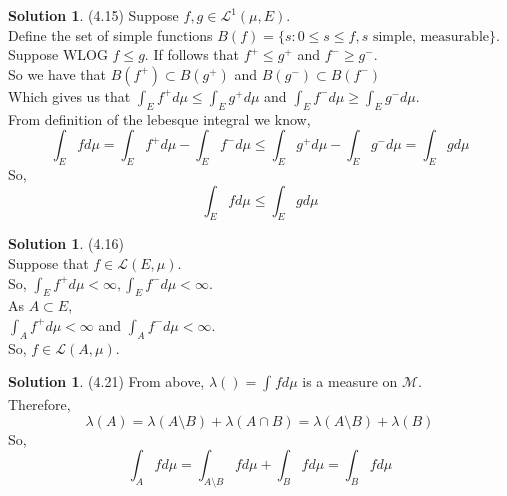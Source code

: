 \documentclass[letterpaper,12pt]{article}
\theoremstyle{definition}
\newtheorem{solution}[theorem]{Solution}
\begin{document}
\begin{solution}{(4.15)}
Suppose $f,g \in \mathcal{L}^1(\mu,E)$. \\
Define the set of simple functions $B(f) = \{ s : 0 \leq s \leq f, s \text{ simple, measurable}  \}$. \\
Suppose WLOG $f \leq g$. If follows that $f^+ \leq g^+$ and $f^- \geq g^-$. \\
So we have that $B(f^+) \subset B(g^+)$ and $B(g^-) \subset B(f^-)$ \\
Which gives us that $ \int_E f^+ d\mu \leq \int_E g^+ d\mu$ and $\int_E f^- d\mu \geq \int_E g^- d\mu$. \\
From definition of the lebesque integral we know,
\begin{equation*}
	\int_E fd\mu = \int_E f^+ d\mu - \int_E f^- d\mu \leq \int_E g^+ d\mu - \int_E g^- d\mu = \int_E g d\mu
\end{equation*}
So,
\begin{equation*}
	\int_E fd\mu \leq \int_E g d\mu
\end{equation*}
\end{solution}

\begin{solution}{(4.16)} \\
Suppose that $f \in \mathcal{L}(E, \mu)$. \\
So, $ \int_E f^+ d\mu < \infty, \int_E f^- d\mu < \infty$. \\
As $A \subset E$, \\
$\int_A f^+ d\mu < \infty$ and $\int_A f^- d\mu < \infty$. \\
So, $f \in \mathcal{L}(A, \mu)$.
\end{solution}

\begin{solution}{(4.21)}
From above, $ \lambda() = \int_{} f d\mu $ is a measure on $\mathcal{M}$. \\
Therefore,
$$ \lambda(A) = \lambda(A \setminus B) + \lambda(A \cap B) = \lambda(A \setminus B) + \lambda(B) $$
So,
$$ \int_A fd\mu = \int_{A \setminus B} fd\mu + \int_B fd\mu = \int_B fd\mu $$

\end{solution}
\end{document}
